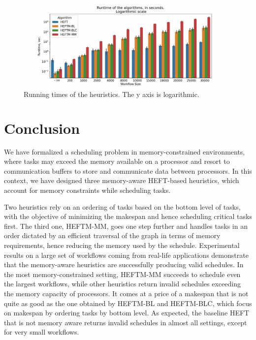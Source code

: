 \documentclass[conference]{IEEEtran}
\newcommand{\algo}[1]{\textsc{#1}}
\newcommand{\heft}{\algo{HEFT}\xspace}
\newcommand{\heftmm}{\algo{HEFTM-MM}\xspace}
\newcommand{\heftbl}{\algo{HEFTM-BL}\xspace}
\newcommand{\heftblc}{\algo{HEFTM-BLC}\xspace}
\newcommand{\skug}[1]{{\color{blue}[SK: #1]}}
\begin{document}
    \begin{figure}[tb]
        \centering
        \includegraphics[width=1.1\columnwidth] {images/runtimes-logarithmic}
        \caption{Running times of the heuristics. The y axis is logarithmic.}
        \label{fig:runtimes-log}
        \vspace{-0.3cm}
    \end{figure}





\section{Conclusion} %
\label{sec:conc}

We have formalized a scheduling problem in memory-constrained environments, where tasks
may exceed the memory available on a processor and resort to communication buffers
to store and communicate data between processors. In this context, we have 
designed three memory-aware HEFT-based heuristics, which account for memory
constraints while scheduling tasks. 

Two heuristics rely on an ordering of tasks based on the bottom level of tasks, with the objective
of minimizing the makespan and hence scheduling critical tasks first. The third one, \heftmm,
goes one step further and handles tasks in an order dictated by an efficient traversal
of the graph in terms of memory requirements, hence reducing the memory used
by the schedule. Experimental results on a large set of workflows coming from real-life applications
demonstrate that the memory-aware heuristics are  successfully producing valid schedules. 
In the most memory-constrained setting, \heftmm succeeds to schedule even the largest workflows,
while other heuristics return invalid schedules exceeding the memory capacity of processors. 
It comes at a price of a makespan that is not quite as good as the one obtained by \heftbl
and \heftblc, which focus on makespan by ordering tasks by bottom level. 
As expected, the baseline \heft that is not memory aware returns invalid schedules in almost
all settings, except for very small workflows. 
\end{document}

